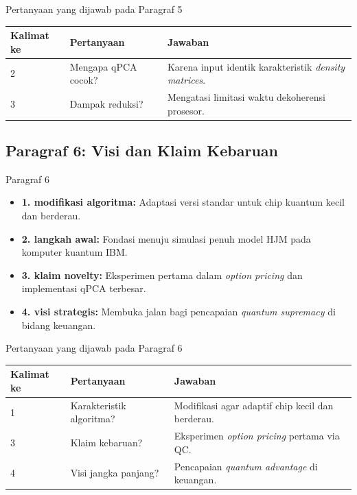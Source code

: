 \begin{frame}{Pertanyaan yang dijawab pada Paragraf 5}
    \centering
    \small
    \begin{tabular}{lp{4.5cm}p{6cm}}
        \toprule
        Kalimat ke & Pertanyaan & Jawaban \\
        \midrule
        2 & Mengapa qPCA cocok? & Karena input identik karakteristik \textit{density matrices}. \\
        3 & Dampak reduksi? & Mengatasi limitasi waktu dekoherensi prosesor. \\
        \bottomrule
    \end{tabular}
\end{frame}

\subsection{Paragraf 6: Visi dan Klaim Kebaruan}
\begin{frame}{Paragraf 6}
    \begin{itemize}
        \item \textbf{1. modifikasi algoritma:} Adaptasi versi standar untuk chip kuantum kecil dan berderau.
        \item \textbf{2. langkah awal:} Fondasi menuju simulasi penuh model HJM pada komputer kuantum IBM.
        \item \textbf{3. klaim novelty:} Eksperimen pertama dalam \textit{option pricing} dan implementasi qPCA terbesar.
        \item \textbf{4. visi strategis:} Membuka jalan bagi pencapaian \textit{quantum supremacy} di bidang keuangan.
    \end{itemize}
\end{frame}

\begin{frame}{Pertanyaan yang dijawab pada Paragraf 6}
    \centering
    \small
    \begin{tabular}{lp{4.5cm}p{6cm}}
        \toprule
        Kalimat ke & Pertanyaan & Jawaban \\
        \midrule
        1 & Karakteristik algoritma? & Modifikasi agar adaptif chip kecil dan berderau. \\
        3 & Klaim kebaruan? & Eksperimen \textit{option pricing} pertama via QC. \\
        4 & Visi jangka panjang? & Pencapaian \textit{quantum advantage} di keuangan. \\
        \bottomrule
    \end{tabular}
\end{frame}
